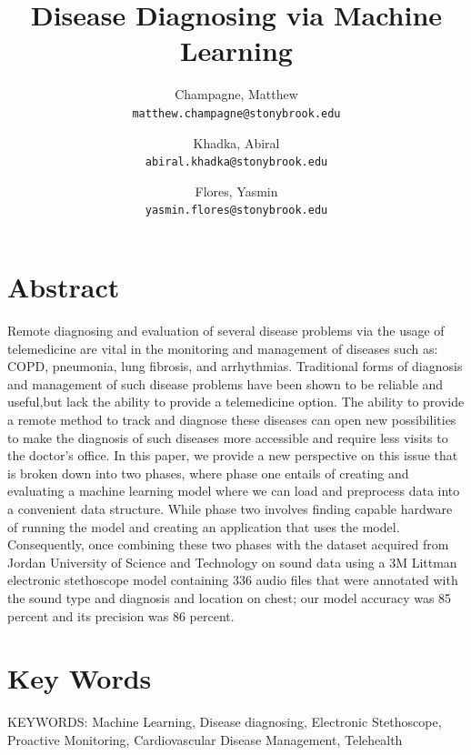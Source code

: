 \documentclass[twocolumn]{article}
\begin{document}
\title{Disease Diagnosing via Machine Learning}
\author{
  Champagne, Matthew \\
  \texttt{matthew.champagne@stonybrook.edu}
  \and
  Khadka, Abiral \\
  \texttt{abiral.khadka@stonybrook.edu}
  \and
  Flores, Yasmin \\
  \texttt{yasmin.flores@stonybrook.edu}
}
\maketitle

\section{Abstract} 
Remote diagnosing and evaluation of several disease problems via the usage of telemedicine are vital in the monitoring and management of diseases such as: COPD, pneumonia, lung fibrosis, and arrhythmias. Traditional forms
of diagnosis and management of such disease problems have been shown to be reliable and useful,but lack the ability to provide a telemedicine option. The ability to provide a remote method to track and diagnose these diseases can open new possibilities to make the diagnosis of such diseases more accessible and require less visits to the doctor's office. In this paper, we provide a new perspective on this issue that is broken down into two phases, where phase one entails of creating and evaluating a machine learning model where we can load and preprocess data into a convenient data structure. While phase two involves finding capable hardware of running the model and creating an application that uses the model. Consequently, once combining these two phases with the dataset acquired from Jordan University of Science and Technology on sound data using a 3M Littman electronic stethoscope model containing 336 audio files that were annotated with the sound type and diagnosis and location on chest; our model accuracy was 85 percent and its precision was 86 percent. 


\section{Key Words} 
KEYWORDS: Machine Learning, Disease diagnosing, Electronic Stethoscope, Proactive Monitoring, Cardiovascular Disease Management, Telehealth 
\end{document}
